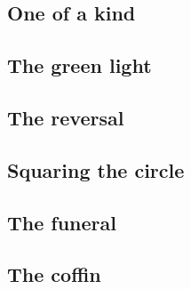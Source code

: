 
\subsection{One of a kind}


\subsection{The green light}


\subsection{The reversal}


\subsection{Squaring the circle}


\subsection{The funeral}


\subsection{The coffin}




